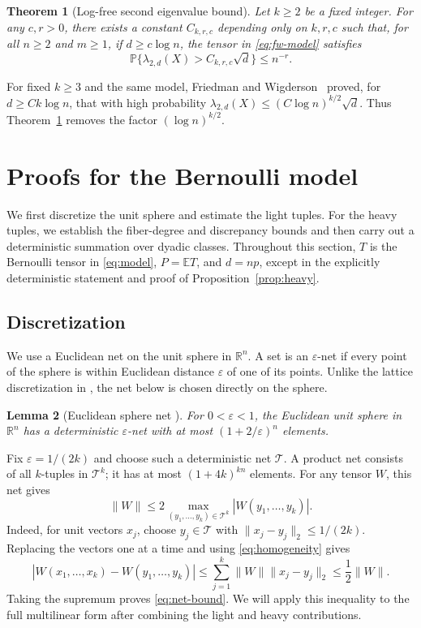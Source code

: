 \documentclass[10pt,a4paper]{amsart}
\numberwithin{equation}{section}
\newtheorem{theorem}{Theorem}[section]
\newtheorem{lemma}[theorem]{Lemma}
\newcommand{\E}{\mathbb E}
\newcommand{\Pp}{\mathbb P}
\newcommand{\R}{\mathbb R}
\newcommand{\eps}{\varepsilon}
\begin{document}
\begin{theorem}[Log-free second eigenvalue bound]\label{thm:fw}
Let $k\ge2$ be a fixed integer. For any $c,r>0$, there exists a constant
$C_{k,r,c}$ depending only on $k,r,c$ such that, for all $n\ge2$ and
$m\ge1$, if $ d\ge c\log n$, the tensor in \eqref{eq:fw-model} satisfies
\[
 \Pp\{\lambda_{2,d}(X)>C_{k,r,c}\sqrt d\}\le n^{-r}.
\]
\end{theorem}

For fixed $k\ge3$ and the same  model,
Friedman and Wigderson~\cite[Theorem~1.5]{FW95} proved, for
$d\ge Ck\log n$, that with high probability
 $\lambda_{2,d}(X)\le (C\log n)^{k/2}\sqrt d$.
Thus Theorem~\ref{thm:fw} removes the factor $(\log n)^{k/2}$.




\section{Proofs for the Bernoulli model}\label{sec:proof}

We first discretize the unit sphere and estimate the light tuples.
For the heavy tuples, we establish the fiber-degree and discrepancy
bounds and then carry out a deterministic summation over dyadic
classes. Throughout this section, $T$ is the Bernoulli tensor in
\eqref{eq:model}, $P=\E T$, and $d=np$, except in the explicitly
deterministic statement and proof of Proposition~\ref{prop:heavy}.

\subsection{Discretization}\label{sec:discretization}

We use a Euclidean net on the unit sphere in $\R^n$.
A set is an $\eps$-net if every point of the sphere is within
Euclidean distance $\eps$ of one of its points.
Unlike the lattice discretization in \cite[Section~4.1]{ZZ21},
the net below is chosen directly on the sphere.
\begin{lemma}[Euclidean sphere net {\cite[Corollary~4.2.11]{V26}}]\label{lem:net}
For $0<\eps<1$, the Euclidean unit sphere in $\R^n$ has a deterministic
$\eps$-net with at most $(1+2/\eps)^n$ elements.
\end{lemma}

Fix $\eps=1/(2k)$ and choose such a deterministic net $\mathcal T$.
A product net consists of all $k$-tuples in $\mathcal T^k$;
it has at most $(1+4k)^{kn}$ elements.
For any tensor $W$, this net gives
\begin{equation}\label{eq:net-bound}
 \|W\|\le2\max_{(y_1,\ldots,y_k)\in\mathcal T^k}
                       |W(y_1,\ldots,y_k)|.
\end{equation}
Indeed, for unit vectors $x_j$, choose $y_j\in\mathcal T$ with
$\|x_j-y_j\|_2\le1/(2k)$. Replacing the vectors one at a time and
using \eqref{eq:homogeneity} gives
\[
 |W(x_1,\ldots,x_k)-W(y_1,\ldots,y_k)|
 \le\sum_{j=1}^k\|W\|\|x_j-y_j\|_2
 \le\frac12\|W\|.
\]
Taking the supremum proves \eqref{eq:net-bound}. We will apply this
inequality to the full multilinear form after combining the light
and heavy contributions.
\end{document}
